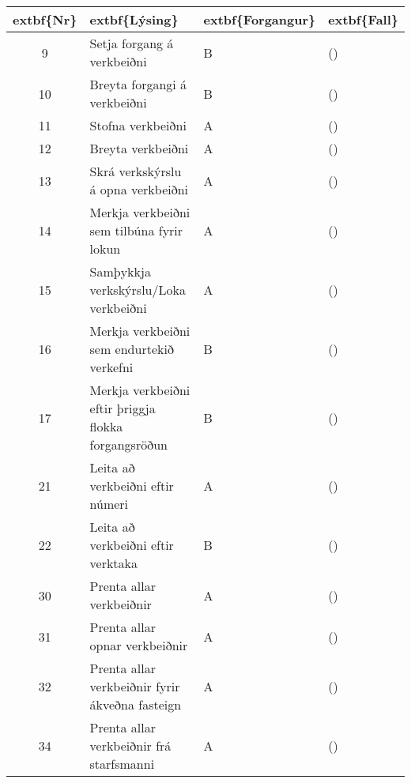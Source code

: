 \documentclass[a4paper]{article}
\begin{document}
\begin{tabular}{|c|p{10cm}|l|l|}
\hline
	extbf\{Nr\}&	extbf\{Lýsing\}&	extbf\{Forgangur\}&	extbf\{Fall\}\\
\hline
9&Setja forgang á verkbeiðni&B &()\\
\hline
10&Breyta forgangi á verkbeiðni&B &()\\
\hline
11&Stofna verkbeiðni&A &()\\
\hline
12&Breyta verkbeiðni&A &()\\
\hline
13&Skrá verkskýrslu á opna verkbeiðni&A &()\\
\hline
14&Merkja verkbeiðni sem tilbúna fyrir lokun&A &()\\
\hline
15&Samþykkja verkskýrslu/Loka verkbeiðni&A &()\\
\hline
16&Merkja verkbeiðni sem endurtekið verkefni&B &()\\
\hline
17&Merkja verkbeiðni eftir þriggja flokka forgangsröðun&B &()\\
\hline
21&Leita að verkbeiðni eftir númeri&A &()\\
\hline
22&Leita að verkbeiðni eftir verktaka&B &()\\
\hline
30&Prenta allar verkbeiðnir&A &()\\
\hline
31&Prenta allar opnar verkbeiðnir&A &()\\
\hline
32&Prenta allar verkbeiðnir fyrir ákveðna fasteign&A &()\\
\hline
34&Prenta allar verkbeiðnir frá starfsmanni&A &()\\
\hline
\end{tabular}
\end{document}
